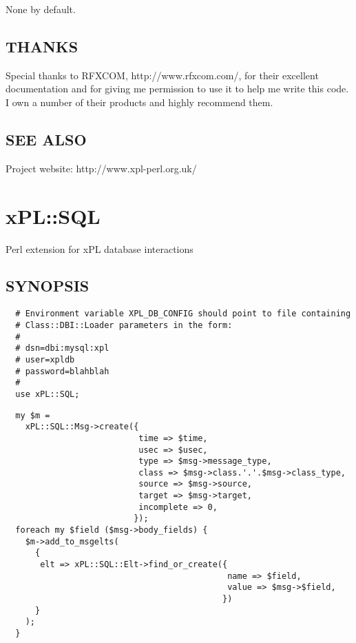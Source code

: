 None by default.

\subsection*{THANKS\label{xPL::RF::X10Security_THANKS}}


Special thanks to RFXCOM, \textsf{http://www.rfxcom.com/}, for their
excellent documentation and for giving me permission to use it to help
me write this code.  I own a number of their products and highly
recommend them.

\subsection*{SEE ALSO\label{xPL::RF::X10Security_SEE_ALSO}}


Project website: http://www.xpl-perl.org.uk/

\section{xPL::SQL\label{xPL::SQL}}


Perl extension for xPL database interactions

\subsection*{SYNOPSIS\label{xPL::SQL_SYNOPSIS}}
\begin{verbatim}
  # Environment variable XPL_DB_CONFIG should point to file containing
  # Class::DBI::Loader parameters in the form:
  #
  # dsn=dbi:mysql:xpl
  # user=xpldb
  # password=blahblah
  #
  use xPL::SQL;
\end{verbatim}
\begin{verbatim}
  my $m =
    xPL::SQL::Msg->create({
                           time => $time,
                           usec => $usec,
                           type => $msg->message_type,
                           class => $msg->class.'.'.$msg->class_type,
                           source => $msg->source,
                           target => $msg->target,
                           incomplete => 0,
                          });
  foreach my $field ($msg->body_fields) {
    $m->add_to_msgelts(
      {
       elt => xPL::SQL::Elt->find_or_create({
                                             name => $field,
                                             value => $msg->$field,
                                            })
      }
    );
  }
\end{verbatim}
